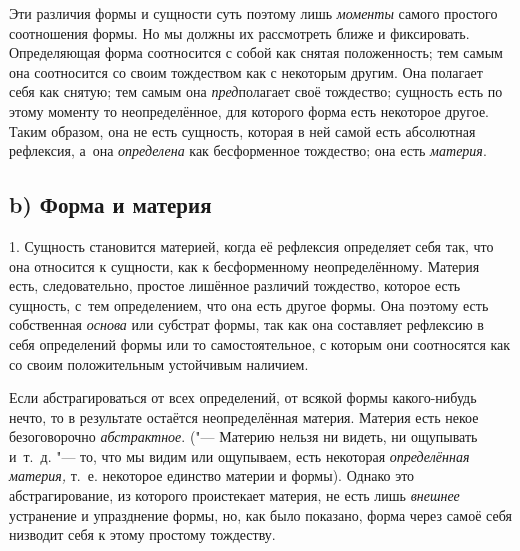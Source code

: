 Эти различия формы и сущности суть поэтому лишь {\em моменты} самого простого
соотношения формы. Но мы должны их рассмотреть ближе и фиксировать.
Определяющая форма соотносится с собой как снятая положенность; тем самым она
соотносится со своим тождеством как с некоторым другим. Она полагает себя как
снятую; тем самым она {\em пред}полагает своё тождество; сущность есть по этому
моменту то неопределённое, для которого форма есть некоторое другое. Таким
образом, она не есть сущность, которая в ней самой есть абсолютная рефлексия,
а~она {\em определена} как бесформенное тождество; она есть {\em материя}.

\subsection[b) Форма и материя]{b) Форма и материя}

1. Сущность становится материей, когда её рефлексия определяет себя так, что
она относится к сущности, как к бесформенному неопределённому. Материя есть,
следовательно, простое лишённое различий тождество, которое есть сущность,
с~тем определением, что она есть другое формы. Она поэтому есть собственная
{\em основа} или субстрат формы, так как она составляет рефлексию в себя
определений формы или то самостоятельное, с которым они соотносятся как со
своим положительным устойчивым наличием.

Если абстрагироваться от всех определений, от всякой формы какого-нибудь нечто,
то в результате остаётся неопределённая материя. Материя есть некое
безоговорочно {\em абстрактное}. ("--- Материю нельзя ни видеть, ни ощупывать
и~т.~д. "--- то, что мы видим или ощупываем, есть некоторая {\em определённая
материя,} т.~е. некоторое единство материи и формы). Однако это
абстрагирование, из которого проистекает материя, не есть лишь {\em внешнее}
устранение и упразднение формы, но, как было показано, форма через самоё себя
низводит себя к этому простому тождеству.

